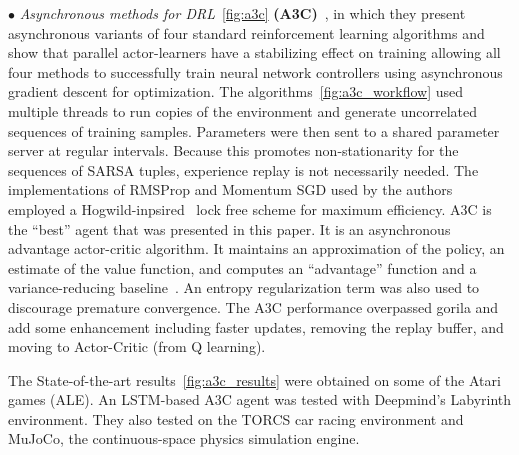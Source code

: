$\bullet$ \textit{Asynchronous methods for DRL}~\ref{fig:a3c} \textbf{(A3C)}~\parencite{mnih2016asynchronous}, in which they present asynchronous variants of four standard reinforcement learning algorithms and show that parallel actor-learners have a stabilizing effect on training allowing all four methods to successfully train neural network controllers using asynchronous gradient descent for optimization. The algorithms~\ref{fig:a3c_workflow} used multiple threads to run copies of the environment and generate uncorrelated sequences of training samples. Parameters were then sent to a shared parameter server at regular intervals. Because this promotes non-stationarity for the sequences of SARSA tuples, experience replay is not necessarily needed. The implementations of RMSProp and Momentum SGD used by the authors employed a Hogwild-inpsired~\parencite{recht2011hogwild} lock free scheme for maximum efficiency. A3C is the ``best'' agent that was presented in this paper. It is an asynchronous advantage actor-critic algorithm. It maintains an approximation of the policy, an estimate of the value function, and computes an ``advantage'' function and a variance-reducing baseline~\parencite{degris2012off}. An entropy regularization term was also used to discourage premature convergence. The A3C performance overpassed gorila and add some enhancement including faster updates, removing  the replay buffer, and moving to Actor-Critic (from Q learning).

The State-of-the-art results~\ref{fig:a3c_results} were obtained on some of the Atari games (ALE). An LSTM-based A3C agent was tested with Deepmind’s Labyrinth environment. They also tested on the TORCS car racing environment and MuJoCo, the continuous-space physics simulation engine.

